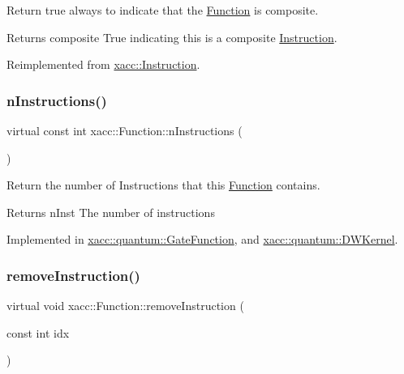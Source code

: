 Return true always to indicate that the \hyperlink{a01653}{Function} is composite.

\begin{DoxyReturn}{Returns}
composite True indicating this is a composite \hyperlink{a01657}{Instruction}. 
\end{DoxyReturn}


Reimplemented from \hyperlink{a01657_a4383f1036d0fcfe890ab9c613dbd5f38}{xacc\+::\+Instruction}.

\mbox{\label{a01653_a8901985525f59713e14c61713e07c086}} 
\subsubsection{\texorpdfstring{n\+Instructions()}{nInstructions()}}
{\footnotesize\ttfamily virtual const int xacc\+::\+Function\+::n\+Instructions (\begin{DoxyParamCaption}{ }\end{DoxyParamCaption})\hspace{0.3cm}{\ttfamily [pure virtual]}}

Return the number of Instructions that this \hyperlink{a01653}{Function} contains.

\begin{DoxyReturn}{Returns}
n\+Inst The number of instructions 
\end{DoxyReturn}


Implemented in \hyperlink{a01249_aa70b26156c060fec71316fe5e98bb102}{xacc\+::quantum\+::\+Gate\+Function}, and \hyperlink{a01221_a79aecc7419a20b8779372ef36fc24806}{xacc\+::quantum\+::\+D\+W\+Kernel}.

\mbox{\label{a01653_ab6478b09bb28e194bb555b3180737733}} 
\subsubsection{\texorpdfstring{remove\+Instruction()}{removeInstruction()}}
{\footnotesize\ttfamily virtual void xacc\+::\+Function\+::remove\+Instruction (\begin{DoxyParamCaption}\item[{const int}]{idx }\end{DoxyParamCaption})\hspace{0.3cm}{\ttfamily [pure virtual]}}

